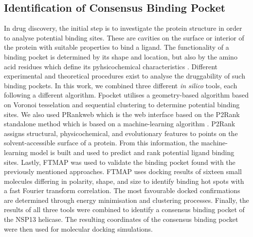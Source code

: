 \documentclass[11pt, letterpaper, titlepage]{article}
\renewcommand{\cite}{\parencite}
\begin{document}

\subsection{Identification of Consensus Binding Pocket}
In drug discovery, the initial step is to investigate the protein structure in order to analyse potential binding sites. These are cavities on the surface or interior of the protein with suitable properties to bind a ligand. The functionality of a binding pocket is determined by its shape and location, but also by the amino acid residues which define its pyhsicochemical characteristics \cite{Stank_2016}. 
Different experimental and theoretical procedures exist to analyse the druggability of such binding pockets. In this work, we combined three different \textit{in silico} tools, each following a different algorithm. Fpocket \cite{package_Fpocket} utilises a geometry-based algorithm based on Voronoi tesselation and sequential clustering to determine potential binding sites. We also used PRankweb which is the web interface based on the P2Rank standalone method which is based on a machine-learning algorithm \cite{package_P2Rank, package_PrankWeb, package_PrankWeb3}. 
P2Rank assigns structural, physicochemical, and evolutionary features to points on the solvent-accessible surface of a protein. From this information, the machine-learning model is built and used to predict and rank potential ligand binding sites. Lastly, FTMAP \cite{package_FTMAP} was used to validate the binding pocket found with the previously mentioned approaches. FTMAP uses docking results of sixteen small molecules differing in polarity, shape, and size to identify binding hot spots with a fast Fourier transform correlation. The most favourable docked confirmations are determined through energy minimisation and clustering processes.
Finally, the results of all three tools were combined to identify a consensus binding pocket of the NSP13 helicase. The resulting coordinates of the consensus binding pocket were then used for molecular docking simulations. 
\end{document}
